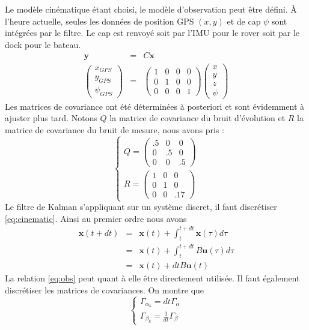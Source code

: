 \documentclass[12pt]{report}
\begin{document}
Le modèle cinématique étant choisi, le modèle d'observation peut être défini. À l'heure actuelle, seules les données de position GPS $(x, y)$ et de cap $\psi$ sont intégrées par le filtre. Le cap est renvoyé soit par l'IMU pour le rover soit par le dock pour le bateau.
\begin{eqnarray}
  \mathbf{y} & = & C \mathbf{x} \nonumber\\
  \label{eq:obs} \left( \begin{array}{c}
    x_{GPS}\\
    y_{GPS}\\
    \psi_{GPS}
  \end{array} \right) & = & \left( \begin{array}{cccc}
    1 & 0 & 0 & 0\\
    0 & 1 & 0 & 0\\
    0 & 0 & 0 & 1
  \end{array} \right) \left( \begin{array}{c}
    x\\
    y\\
    z\\
    \psi
  \end{array} \right) 
\end{eqnarray}
Les matrices de covariance ont été déterminées à posteriori et sont évidemment à ajuster plus tard. Notons $Q$ la matrice de covariance du bruit d'évolution et $R$ la matrice de covariance du bruit de mesure, nous avons pris :
\[ \left\{ \begin{array}{c}
     Q = \left( \begin{array}{ccc}
       .5 & 0 & 0\\
       0 & .5 & 0\\
       0 & 0 & .5
     \end{array} \right)\\
     R = \left( \begin{array}{ccc}
       1 & 0 & 0\\
       0 & 1 & 0\\
       0 & 0 & .17
     \end{array} \right)
   \end{array} \right. \]
Le filtre de Kalman s'appliquant sur un système discret, il faut discrétiser \eqref{eq:cinematic}. Ainsi au premier ordre nous avons
\begin{eqnarray}
  \mathbf{x} (t + dt) & = & \mathbf{x} (t) + \int_t^{t + dt}
  \dot{\mathbf{x}} (\tau) d \tau \nonumber\\
  & = & \mathbf{x} (t) + \int_t^{t + dt} B \mathbf{u} (\tau) d
  \tau \nonumber\\
  & = & \mathbf{x} (t) + dt B \mathbf{u} (t) \nonumber
\end{eqnarray}
La relation \eqref{eq:obs} peut quant à elle être directement utilisée. Il faut également discrétiser les matrices de covariances. On montre que
\[ \left\{ \begin{array}{c}
     \Gamma_{\alpha_k} = dt \Gamma_{\alpha}\\
     \Gamma_{\beta_k} = \frac{1}{dt} \Gamma_{\beta}
   \end{array} \right. \]
\end{document}
